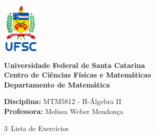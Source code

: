 \documentclass[12pt]{article}
\begin{document}
\ \vspace{-1.4cm}
\begin{tcolorbox}[colback=black!0]
    \noindent
    \begin{minipage}{0.14\linewidth}
        \hspace*{-0.2cm}\includegraphics[height = 2.5cm]{UFSC.png}
    \end{minipage}
	\noindent
	\begin{minipage}{0.79\linewidth}
	    \begin{center}
	        \vspace*{0.2cm}
	        {\bf \large Universidade Federal de Santa Catarina} \\ \vspace{0.3cm}
			{\bf \large Centro de Ciências Físicas e Matemáticas} \\ \vspace{0.3cm}
			{\bf \large Departamento de Matemática}
		\end{center}
	\end{minipage}
\end{tcolorbox}

\noindent\textbf{Disciplina:} MTM5812 - H-Álgebra II\\
\textbf{Professora:} Melissa Weber Mendonça

\begin{center}
    \Large{3\textordfeminine\ Lista de Exercícios}
\end{center}
\end{document}
